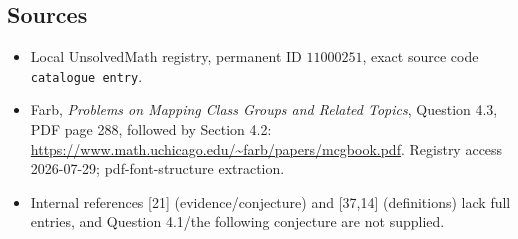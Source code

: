 \documentclass[11pt]{article}
\begin{document}
\subsection{Sources}
\begin{itemize}
\item Local UnsolvedMath registry, permanent ID \(11000251\), exact source code \texttt{catalogue entry}.
\item Farb, \emph{Problems on Mapping Class Groups and Related Topics}, Question 4.3, PDF page 288, followed by Section 4.2: \url{https://www.math.uchicago.edu/~farb/papers/mcgbook.pdf}. Registry access 2026-07-29; pdf-font-structure extraction.
\item Internal references [21] (evidence/conjecture) and [37,14] (definitions) lack full entries, and Question 4.1/the following conjecture are not supplied.
\end{itemize}
\end{document}
